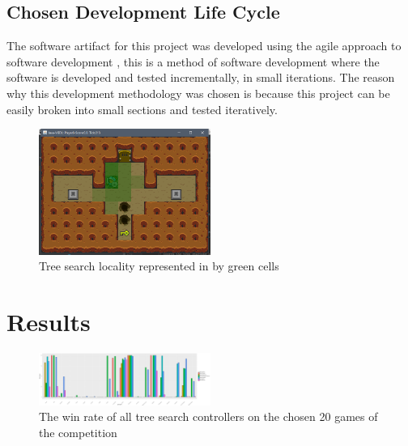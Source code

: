 \documentclass[journal]{IEEEtran}
\begin{document}
	\subsection{Chosen Development Life Cycle}
		The software artifact for this project was developed using the agile approach to software development \cite{beck2001manifesto, cockburn2001agile, dybaa2008empirical}, this is a method of software development where the software is developed and tested incrementally, in small iterations. The reason why this development methodology was chosen is because this project can be easily broken into small sections and tested iteratively.



	\begin{figure}[h]
		   \centering
		   \includegraphics[width=0.5\textwidth]{BrFS-Locality}
		   \caption{ Tree search locality represented in by green cells }
		   \label{fig:locality}
	\end{figure}





\section{Results}
		\begin{figure}[h]
		    \centering
		    \includegraphics[width=0.5\textwidth]{allGameBarPlot}
		    \caption{ The win rate of all tree search controllers on the chosen 20 games of the competition}
		    \label{fig:allGameBarPlot}
		\end{figure}
\end{document}
